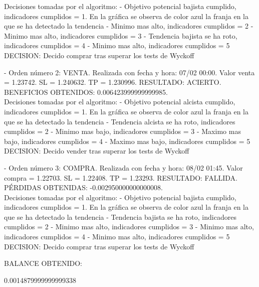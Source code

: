 Decisiones tomadas por el algoritmo: - Objetivo potencial bajista cumplido, indicadores cumplidos = 1. En la gráfica se observa de color azul la franja en la que se ha detectado la tendencia - Minimo mas alto, indicadores cumplidos = 2 - Minimo mas alto, indicadores cumplidos = 3 - Tendencia bajista se ha roto, indicadores cumplidos = 4 - Minimo mas alto, indicadores cumplidos = 5 DECISION: Decido comprar tras superar los tests de Wyckoff \newline

- Orden número 2: VENTA. Realizada con fecha y hora: 07/02 00:00. Valor venta = 1.23742. SL = 1.240632. TP = 1.230996. RESULTADO: ACIERTO. BENEFICIOS OBTENIDOS: 0.006423999999999985.\\

Decisiones tomadas por el algoritmo: - Objetivo potencial alcista cumplido, indicadores cumplidos = 1. En la gráfica se observa de color azul la franja en la que se ha detectado la tendencia - Tendencia alcista se ha roto, indicadores cumplidos = 2 - Minimo mas bajo, indicadores cumplidos = 3 - Maximo mas bajo, indicadores cumplidos = 4 - Maximo mas bajo, indicadores cumplidos = 5 DECISION: Decido vender tras superar los tests de Wyckoff\newline

- Orden número 3: COMPRA. Realizada con fecha y hora: 08/02 01:45. Valor compra = 1.22703. SL = 1.22408. TP = 1.23293. RESULTADO: FALLIDA. PÉRDIDAS OBTENIDAS: -0.002950000000000008.\\

Decisiones tomadas por el algoritmo: - Objetivo potencial bajista cumplido, indicadores cumplidos = 1. En la gráfica se observa de color azul la franja en la que se ha detectado la tendencia - Tendencia bajista se ha roto, indicadores cumplidos = 2 - Minimo mas alto, indicadores cumplidos = 3 - Minimo mas alto, indicadores cumplidos = 4 - Minimo mas alto, indicadores cumplidos = 5 DECISION: Decido comprar tras superar los tests de Wyckoff\newline

\color{blue}
BALANCE OBTENIDO:\newline

0.0014879999999999338\newline
\color{black}

